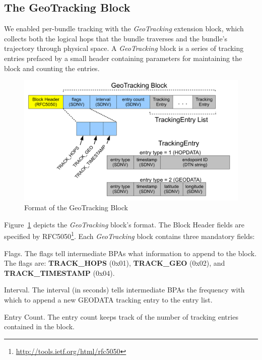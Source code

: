 \subsection{The GeoTracking Block}
We enabled per-bundle tracking with the {\em GeoTracking} extension block, which collects both the logical hops that the bundle traverses and the bundle's trajectory through physical space. A {\em GeoTracking} block is a series of tracking entries prefaced by a small header containing parameters for maintaining the block and counting the entries.
\begin{figure}[!h]
\begin{center}
\includegraphics[width=.9\columnwidth]{figures/tracking-block.pdf}
\end{center}
\vspace{-.5cm}
\caption{Format of the GeoTracking Block}
\label{fig:tracking-block}
\vspace{-.25cm}
\end{figure}

\begin{sloppypar}
Figure~\ref{fig:tracking-block} depicts the {\em GeoTracking} block's format. The Block Header fields are specified by RFC5050\footnote{\scriptsize\url{http://tools.ietf.org/html/rfc5050}}. 
Each {\em GeoTracking} block contains three mandatory fields:
\begin{description*}
  \item[Flags.] The flags tell intermediate BPAs what information to append to the block. The flags are: {\bf TRACK\_HOPS} (0x01), {\bf TRACK\_GEO} (0x02), and {\bf TRACK\_TIMESTAMP} (0x04).
  \item[Interval.] The interval (in seconds) tells intermediate BPAs the frequency with which to append a new GEODATA tracking entry to the entry list.  
  \item[Entry Count.] The entry count keeps track of the number of tracking entries contained in the block.
\end{description*}
\end{sloppypar}

